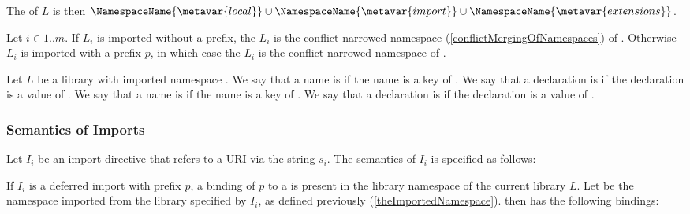 \documentclass[makeidx]{article}
\begin{document}

\LMHash{}%
The  of $L$ is then
$\NamespaceName{\metavar{local}} \cup
\NamespaceName{\metavar{import}} \cup
\NamespaceName{\metavar{extensions}}$.

\LMHash{}%
Let $i \in 1 .. m$.
If $L_i$ is imported without a prefix, the
$L_i$ is the conflict narrowed namespace
(\ref{conflictMergingOfNamespaces})
of .
%
Otherwise $L_i$ is imported with a prefix $p$,
in which case the  $L_i$
is the conflict narrowed namespace
of .


\LMHash{}%
Let $L$ be a library with imported namespace \NamespaceName.
We say that a name is
if the name is a key of \NamespaceName.
We say that a declaration is
if the declaration is a value of \NamespaceName.
We say that a name is
if the name is a key of .
We say that a declaration is
if the declaration is a value of .


\subsubsection{Semantics of Imports}

\LMHash{}%
Let $I_i$ be an import directive that refers to a URI via the string $s_i$.
The semantics of $I_i$ is specified as follows:

\LMHash{}%
If $I_i$ is a deferred import with prefix $p$, a binding of $p$ to a
 is
present in the library namespace of the current library $L$.
Let  be
the namespace imported from the library specified by $I_i$,
as defined previously
(\ref{theImportedNamespace}).
 then has the following bindings:
\end{document}
